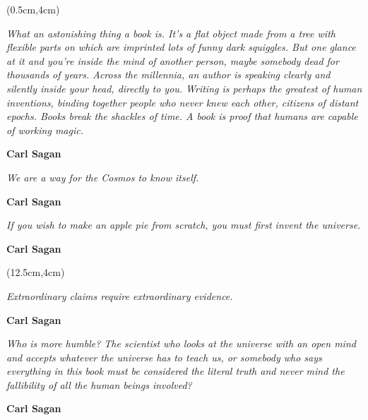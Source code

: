 \begin{dedication}

\vspace{7.1cm}
\PlaceText{69mm}{12.5mm}{ \color{\COR}\noindent\makebox[\linewidth]{\rule{2\paperwidth}{1pt}}}
\PlaceText{69mm}{33mm}{ \color{\COR}\noindent\makebox[\linewidth]{\rule{2\paperwidth}{1pt}}}


\begin{textblock*}{5cm}(0.5cm,4cm)

\epigraph{\large\textit{What an astonishing thing a book is. It's a flat object made from a tree with flexible parts on which are imprinted lots of funny dark squiggles. But one glance at it and you're inside the mind of another person, maybe somebody dead for thousands of years. Across the millennia, an author is speaking clearly and silently inside your head, directly to you. Writing is perhaps the greatest of human inventions, binding together people who never knew each other, citizens of distant epochs. Books break the shackles of time. A book is proof that humans are capable of working magic.}}{\textbf{Carl Sagan \\}}


\epigraph{\large\textit{We are a way for the Cosmos to know itself.}}{\textbf{Carl Sagan \\}}


\epigraph{\large\textit{If you wish to make an apple pie from scratch, you must first invent the universe.}}{\textbf{Carl Sagan \\}}





\end{textblock*}

\begin{textblock*}{5cm}(12.5cm,4cm)

\epigraph{\large\textit{Extraordinary claims require extraordinary evidence.}}{\textbf{Carl Sagan \\}}


\epigraph{\large\textit{Who is more humble? The scientist who looks at the universe with an open mind and accepts whatever the universe has to teach us, or somebody who says everything in this book must be considered the literal truth and never mind the fallibility of all the human beings involved?}}{\textbf{Carl Sagan \\}}


\end{textblock*}
\end{dedication}
